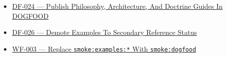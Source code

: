 \begin{itemize}
\tightlist
\item
  \href{https://github.com/flyingrobots/bijou/blob/cbd70612140e7a450d764b3c7be1c6af878b99bc/docs/design/DF-024-publish-philosophy-architecture-and-doctrine-guides-in-dogfood.md}{DF-024 --- Publish Philosophy, Architecture, And Doctrine Guides In DOGFOOD}
\item
  \href{https://github.com/flyingrobots/bijou/blob/cbd70612140e7a450d764b3c7be1c6af878b99bc/docs/design/DF-026-demote-examples-to-secondary-reference-status.md}{DF-026 --- Demote Examples To Secondary Reference Status}
\item
  \href{https://github.com/flyingrobots/bijou/blob/cbd70612140e7a450d764b3c7be1c6af878b99bc/docs/design/WF-003-replace-smoke-examples-with-smoke-dogfood.md}{WF-003 --- Replace \texttt{s\allowbreak{}m\allowbreak{}o\allowbreak{}k\allowbreak{}e\allowbreak{}:\allowbreak{}e\allowbreak{}x\allowbreak{}a\allowbreak{}m\allowbreak{}p\allowbreak{}l\allowbreak{}e\allowbreak{}s\allowbreak{}:\allowbreak{}*} With \texttt{s\allowbreak{}m\allowbreak{}o\allowbreak{}k\allowbreak{}e\allowbreak{}:\allowbreak{}d\allowbreak{}o\allowbreak{}g\allowbreak{}f\allowbreak{}o\allowbreak{}o\allowbreak{}d}}
\end{itemize}

